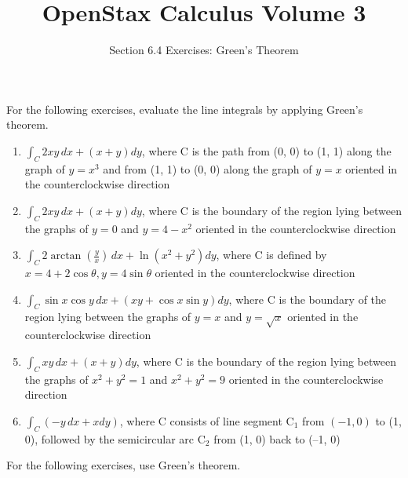 \documentclass{exercises}
\title{OpenStax Calculus Volume 3}
\subtitle{Section 6.4 Exercises: Green’s Theorem}
\author{}
\date{}
\begin{document}
\maketitle


For the following exercises, evaluate the line integrals by applying Green's theorem.

\begin{enumerate}[start=1]
\item $\int_{C}^{}2xy\,dx+(x+y)dy$, where C is the path from (0, 0) to (1, 1) along the graph of $y=x^{3}$ and from (1, 1) to (0, 0) along the graph of $y=x$ oriented in the counterclockwise direction
\item $\int_{C}^{}2xy\,dx+(x+y)dy$, where C is the boundary of the region lying between the graphs of $y=0$ and $y=4-x^{2}$ oriented in the counterclockwise direction
\item $\int_{C}^{}2\arctan(\frac{y}{x})\,dx+\ln(x^{2}+y^{2})dy$, where C is defined by $x=4+2\cos \theta,y=4\sin \theta$ oriented in the counterclockwise direction
\item $\int_{C}^{}\sin x\cos y\,dx+(xy+\cos x\sin y)dy$, where C is the boundary of the region lying between the graphs of $y=x$ and $y=\sqrt{x}$ oriented in the counterclockwise direction
\item $\int_{C}^{}xy\,dx+(x+y)dy$, where C is the boundary of the region lying between the graphs of $x^{2}+y^{2}=1$ and $x^{2}+y^{2}=9$ oriented in the counterclockwise direction
\item $\int_{C}(-y\,dx+xdy)$, where C consists of line segment C$_{1}$ from $(-1,0)$ to (1, 0), followed by the semicircular arc C$_{2}$ from (1, 0) back to (--1, 0)
\end{enumerate}

For the following exercises, use Green's theorem.
\end{document}
